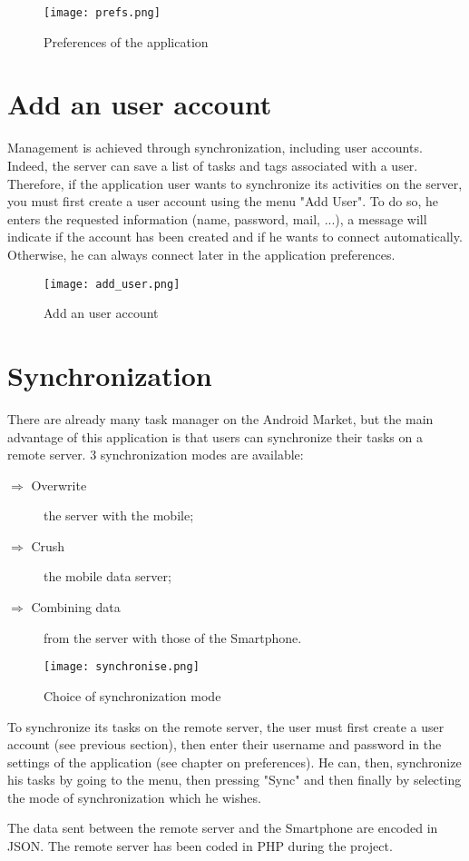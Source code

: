 \begin{figure}[!ht]
    \centering
    \texttt{[image: prefs.png]}
    \caption{Preferences of the application}
\end{figure}

\section{Add an user account}

Management is achieved through synchronization, including user accounts. Indeed, the server can save a list of tasks and tags associated with a user. Therefore, if the application user wants to synchronize its activities on the server, you must first create a user account using the menu "Add User".
To do so, he enters the requested information (name, password, mail, ...), a message will indicate if the account has been created and if he wants to connect automatically. Otherwise, he can always connect later in the application preferences.

\begin{figure}[!ht]
    \centering
    \texttt{[image: add\_user.png]}
    \caption{Add an user account}
\end{figure}

\section{Synchronization}

There are already many task manager on the Android Market, but the main advantage of this application is that users can synchronize their tasks on a remote server.
3 synchronization modes are available:
\begin{description}
    \item[$\Rightarrow$ Overwrite] the server with the mobile;
    \item[$\Rightarrow$ Crush] the mobile data server;
    \item[$\Rightarrow$ Combining data] from the server with those of the Smartphone.
\end{description}

\begin{figure}[!ht]
    \centering
    \texttt{[image: synchronise.png]}
    \caption{Choice of synchronization mode}
\end{figure}

\noindent To synchronize its tasks on the remote server, the user must first create a user account (see previous section), then enter their username and password in the settings of the application (see chapter on preferences). He can, then, synchronize his tasks by going to the menu, then pressing "Sync" and then finally by selecting the mode of synchronization which he wishes.

\noindent The data sent between the remote server and the Smartphone are encoded in JSON. The remote server has been coded in PHP during the project.

\clearpage
